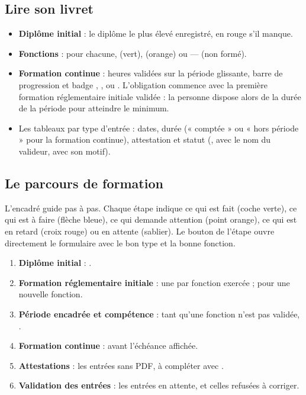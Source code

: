 \documentclass[11pt,a4paper]{article}
\begin{document}

\subsection{Lire son livret}
\begin{itemize}
  \item \textbf{Diplôme initial} : le diplôme le plus élevé enregistré, en
    rouge s'il manque.
  \item \textbf{Fonctions} : pour chacune, 
    (vert),  (orange) ou --- (non formé).
  \item \textbf{Formation continue} : heures validées sur la période
    glissante, barre de progression et badge ,
    ,  ou
    . L'obligation commence avec la première
    formation réglementaire initiale validée : la personne dispose alors de
    la durée de la période pour atteindre le minimum.
  \item Les tableaux par type d'entrée : dates, durée (« comptée » ou « hors
    période » pour la formation continue), attestation et statut
    (,  avec le nom du valideur, 
    avec son motif).
\end{itemize}

\subsection{Le parcours de formation}
L'encadré  guide pas à pas. Chaque étape
indique ce qui est fait (coche verte), ce qui est à faire (flèche bleue), ce
qui demande attention (point orange), ce qui est en retard (croix rouge) ou
en attente (sablier). Le bouton de l'étape ouvre directement le formulaire
 avec le bon type et la bonne fonction.


\begin{enumerate}
  \item \textbf{Diplôme initial} : .
  \item \textbf{Formation réglementaire initiale} : une par fonction
    exercée ;  pour une nouvelle fonction.
  \item \textbf{Période encadrée et compétence} : tant qu'une fonction n'est
    pas validée, .
  \item \textbf{Formation continue} :  avant l'échéance affichée.
  \item \textbf{Attestations} : les entrées sans PDF, à compléter avec
    .
  \item \textbf{Validation des entrées} : les entrées en attente, et celles
    refusées à corriger.
\end{enumerate}
\end{document}
